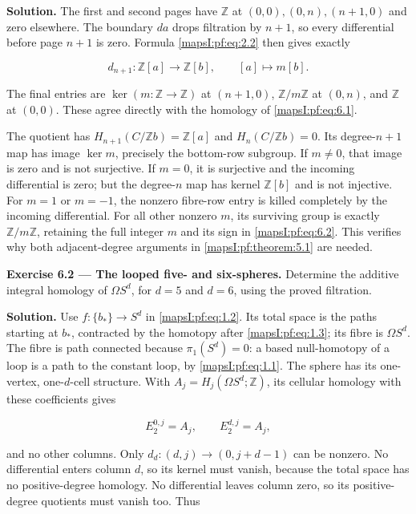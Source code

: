 \textbf{Solution.} The first and second pages have \(\mathbb Z\) at \((0,0),(0,n),(n+1,0)\) and zero elsewhere. The boundary \(da\) drops filtration by \(n+1\), so every differential before page \(n+1\) is zero. Formula \eqref{mapsI:pf:eq:2.2} then gives exactly

\begin{equation}
d_{n+1}:\mathbb Z[a]\longrightarrow\mathbb Z[b],
\qquad [a]\longmapsto m[b].
\label{mapsI:pf:eq:6.2}
\end{equation}

The final entries are \(\ker(m:\mathbb Z\to\mathbb Z)\) at \((n+1,0)\), \(\mathbb Z/m\mathbb Z\) at \((0,n)\), and \(\mathbb Z\) at \((0,0)\). These agree directly with the homology of \eqref{mapsI:pf:eq:6.1}.

The quotient has \(H_{n+1}(C/\mathbb Zb)=\mathbb Z[a]\) and \(H_n(C/\mathbb Zb)=0\). Its degree-\(n+1\) map has image \(\ker m\), precisely the bottom-row subgroup. If \(m\ne0\), that image is zero and is not surjective. If \(m=0\), it is surjective and the incoming differential is zero; but the degree-\(n\) map has kernel \(\mathbb Z[b]\) and is not injective. For \(m=1\) or \(m=-1\), the nonzero fibre-row entry is killed completely by the incoming differential. For all other nonzero \(m\), its surviving group is exactly \(\mathbb Z/m\mathbb Z\), retaining the full integer \(m\) and its sign in \eqref{mapsI:pf:eq:6.2}. This verifies why both adjacent-degree arguments in \cref{mapsI:pf:theorem:5.1} are needed.

\textbf{Exercise 6.2 --- The looped five- and six-spheres.}\label{mapsI:pf:exercise:6.2} Determine the additive integral homology of \(\Omega S^d\), for \(d=5\) and \(d=6\), using the proved filtration.

\textbf{Solution.} Use \(f:\{b_*\}\to S^d\) in \eqref{mapsI:pf:eq:1.2}. Its total space is the paths starting at \(b_*\), contracted by the homotopy after \eqref{mapsI:pf:eq:1.3}; its fibre is \(\Omega S^d\). The fibre is path connected because \(\pi_1(S^d)=0\): a based null-homotopy of a loop is a path to the constant loop, by \eqref{mapsI:pf:eq:1.1}. The sphere has its one-vertex, one-\(d\)-cell structure. With \(A_j=H_j(\Omega S^d;\mathbb Z)\), its cellular homology with these coefficients gives

\begin{equation}
E_2^{0,j}=A_j,\qquad E_2^{d,j}=A_j,
\label{mapsI:pf:eq:6.3}
\end{equation}

and no other columns. Only \(d_d:(d,j)\to(0,j+d-1)\) can be nonzero. No differential enters column \(d\), so its kernel must vanish, because the total space has no positive-degree homology. No differential leaves column zero, so its positive-degree quotients must vanish too. Thus

